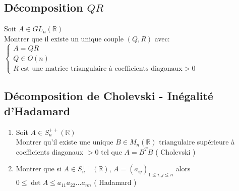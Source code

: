 \documentclass[10pt,a4paper]{article}
\theoremstyle{definition}
\begin{document}
\subsection{Décomposition \(QR\)}
\noindent Soit \(A \in GL_n(\mathbb{R})\) \\
Montrer que il existe un unique couple \((Q, R)\) avec: \\
\(\begin{cases}
    A = QR \\
    Q \in O(n) \\
    R \text{ est une matrice triangulaire à coefficients diagonaux} > 0
\end{cases}\)

\subsection{Décomposition de Cholevski - Inégalité d'Hadamard}
\begin{enumerate}
    \item Soit \(A \in S_n^{++}(\mathbb{R})\) \\
    Montrer qu'il existe une unique \(B \in M_n(\mathbb{R})\) triangulaire supérieure à coefficients diagonaux \(> 0\) tel que \(A = B^T B\) ( Cholevski )
    \item Montrer que si \(A \in S_n^{++}(\mathbb{R})\), \(A = (a_{ij})_{1 \leq i, j \leq n}\) alors \\
    \(0 \leq \det A \leq a_{11} a_{22} ... a_{nn}\) ( Hadamard )
\end{enumerate}
\end{document}
